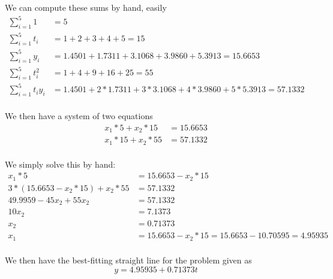 We can compute these sums by hand, easily
\begin{align*}
    \sum_{i=1}^5 1 &= 5 \\
    \sum_{i=1}^5 t_i &= 1 + 2 + 3 + 4 + 5 = 15 \\
    \sum_{i=1}^5 y_i &= 1.4501 + 1.7311 + 3.1068 + 3.9860 + 5.3913 = 15.6653 \\
    \sum_{i=1}^5 t_i^2 &= 1 + 4 + 9 + 16 + 25 = 55 \\
    \sum_{i=1}^5 t_i y_i &= 1.4501 + 2*1.7311 + 3*3.1068 + 4*3.9860 + 5*5.3913 = 57.1332 \\
\end{align*}

We then have a system of two equations
\begin{align*}
    x_1 * 5 + x_2 * 15 &= 15.6653 \\
    x_1 * 15 + x_2 * 55 &= 57.1332 \\
\end{align*}

We simply solve this by hand:
\begin{align*}
    x_1 * 5 &= 15.6653 - x_2 * 15 \\
    3 * (15.6653 - x_2 * 15) + x_2 * 55 &= 57.1332 \\
    49.9959 - 45x_2 + 55x_2 &= 57.1332 \\
    10x_2 &= 7.1373 \\
    x_2 &= 0.71373 \\
    x_1 &= 15.6653 - x_2 * 15 = 15.6653 - 10.70595 = 4.95935 \\
\end{align*}

We then have the best-fitting straight line for the problem given as
\begin{equation*}
    y = 4.95935 + 0.71373t
\end{equation*}